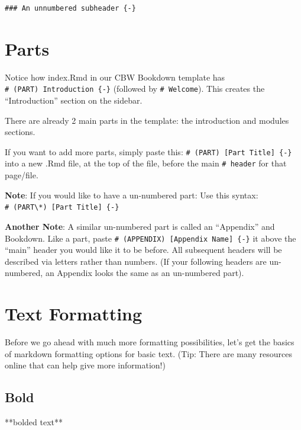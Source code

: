 \documentclass[
]{book}
\newenvironment{Shaded}{\begin{snugshade}}{\end{snugshade}}
\newcommand{\NormalTok}[1]{#1}
\theoremstyle{definition}
\theoremstyle{definition}
\theoremstyle{definition}
\theoremstyle{definition}
\theoremstyle{remark}
\begin{document}
\begin{verbatim}
### An unnumbered subheader {-}
\end{verbatim}

\section{Parts}\label{parts}

Notice how index.Rmd in our CBW Bookdown template has \texttt{\#\ (PART)\ Introduction\ \{-\}} (followed by \texttt{\#\ Welcome}). This creates the ``Introduction'' section on the sidebar.

There are already 2 main parts in the template: the introduction and modules sections.

If you want to add more parts, simply paste this: \texttt{\#\ (PART)\ {[}Part\ Title{]}\ \{-\}} into a new .Rmd file, at the top of the file, before the main \texttt{\#\ header} for that page/file.

\textbf{Note}: If you would like to have a un-numbered part: Use this syntax: \texttt{\#\ (PART\textbackslash{}*)\ {[}Part\ Title{]}\ \{-\}}

\textbf{Another Note}: A similar un-numbered part is called an ``Appendix'' and Bookdown. Like a part, paste \texttt{\#\ (APPENDIX)\ {[}Appendix\ Name{]}\ \{-\}} it above the ``main'' header you would like it to be before. All subsequent headers will be described via letters rather than numbers. (If your following headers are un-numbered, an Appendix looks the same as an un-numbered part).

\section{Text Formatting}\label{text-formatting}

Before we go ahead with much more formatting possibilities, let's get the basics of markdown formatting options for basic text. (Tip: There are many resources online that can help give more information!)

\subsection*{Bold}\label{bold}

\begin{Shaded}
\begin{Highlighting}[]
\NormalTok{**bolded text**}
\end{Highlighting}
\end{Shaded}
\end{document}
